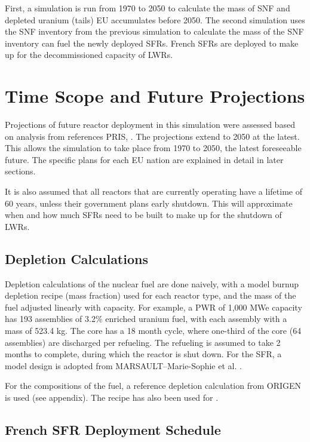 First, a simulation is run from 1970 to 2050 to calculate the mass of 
\gls{SNF} and depleted uranium (tails) EU accumulates before 2050. 
The second simulation uses the \gls{SNF} inventory from the previous
simulation to calculate the mass of the \gls{SNF} inventory can fuel
the newly deployed \gls{SFR}s. French \gls{SFR}s are deployed
to make up for the decommissioned capacity of \gls{LWR}s.


\section{Time Scope and Future Projections}
Projections of future reactor deployment in this simulation were
assessed based on analysis from references \gls{PRIS},
\cite{world_nuclear_2017} \cite{joskow_future_2012} \cite{hatch_politics_2013}.
The projections extend to 2050 at the latest. This allows the simulation to take place from
1970 to 2050, the latest foreseeable future. The specific plans for each EU nation are explained
in detail in later sections.

It is also assumed that all reactors that are 
currently operating have a lifetime of 60 years, unless their government plans
early shutdown. This will approximate when and how much \glspl{SFR} need to be built
to make up for the shutdown of \glspl{LWR}.


\subsection{Depletion Calculations}
Depletion calculations of the nuclear fuel are done
naively, with a model burnup depletion recipe (mass fraction) used
for each reactor type, and the mass of the fuel 
adjusted linearly with capacity. For example, a PWR of
1,000 MWe capacity has 193 assemblies of 3.2\% enriched
uranium fuel, with each assembly with a mass of 523.4 kg.
The core has a 18 month cycle, where one-third of the 
core (64 assemblies) are discharged per refueling. The refueling
is assumed to take 2 months to complete, during which the reactor
is shut down. For the \gls{SFR}, a model design is adopted from
MARSAULT–Marie-Sophie et al. \cite{marsault-marie-sophie_pre-conceptual_2012}.

For the compositions of the fuel, a reference depletion calculation
from ORIGEN is used (see appendix). The recipe has also been used for
\cite{wilson_adoption_2009}.

\subsection{French \gls{SFR} Deployment Schedule}

